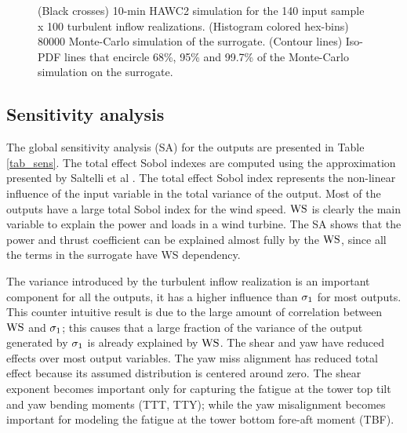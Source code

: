 \documentclass[preprint,12pt]{elsarticle}
\begin{document}
\begin{figure}[p]
\begin{centering}
\caption{(Black crosses) 10-min HAWC2 simulation for the 140 input sample x 100 turbulent inflow realizations. (Histogram colored hex-bins) 80000 Monte-Carlo simulation of the surrogate. (Contour lines) Iso-PDF lines that encircle 68\%, 95\% and 99.7\% of the Monte-Carlo simulation on the surrogate.}
\label{fig_final_surrogates}
\end{centering}
\end{figure}

\subsection{Sensitivity analysis}

The global sensitivity analysis (SA) for the outputs are presented in Table \ref{tab_sens}. The total effect Sobol indexes are computed using the approximation presented by Saltelli et al \cite{saltelli2010variance}. The total effect Sobol index represents the non-linear influence of the input variable in the total variance of the output. Most of the outputs have a large total Sobol index for the wind speed. $\text{WS}$ is clearly the main variable to explain the power and loads in a wind turbine. The SA shows that the power and thrust coefficient can be explained almost fully by the $\text{WS}$, since all the terms in the surrogate have WS dependency. 

The variance introduced by the turbulent inflow realization is an important component for all the outputs, it has a higher influence than $\sigma_{1}$ for most outputs. This counter intuitive result is due to the large amount of correlation between $\text{WS}$ and $\sigma_{1}$; this causes that a large fraction of the variance of the output generated by $\sigma_{1}$ is already explained by $\text{WS}$. The shear and yaw have reduced effects over most output variables. The yaw miss alignment has reduced total effect because its assumed distribution is centered around zero. The shear exponent becomes important only for capturing the fatigue at the tower top tilt and yaw bending moments (TTT, TTY); while the yaw misalignment becomes important for modeling the fatigue at the tower bottom fore-aft moment (TBF).
\end{document}
